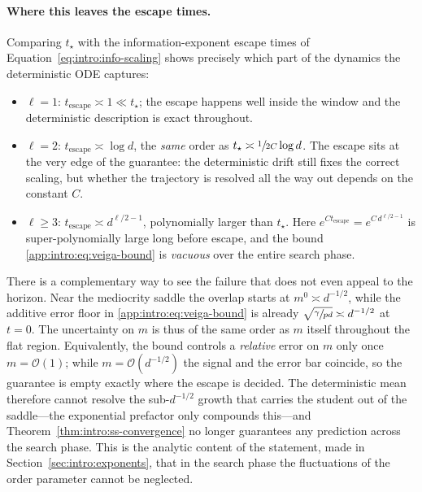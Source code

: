 \paragraph{Where this leaves the escape times.}
Comparing \(t_\star\) with the information-exponent escape times of
Equation~\eqref{eq:intro:info-scaling} shows precisely which part of the dynamics
the deterministic ODE captures:
\begin{itemize}
    \item \(\ell = 1\): \(t_\text{escape} \asymp 1 \ll t_\star\); the escape
    happens well inside the window and the deterministic description is exact
    throughout.
    \item \(\ell = 2\): \(t_\text{escape} \asymp \log d\), the \emph{same} order
    as \(t_\star \asymp \sfrac{1}{2C}\log d\). The escape sits at the very edge of
    the guarantee: the deterministic drift still fixes the correct scaling, but
    whether the trajectory is resolved all the way out depends on the constant
    \(C\).
    \item \(\ell \geq 3\): \(t_\text{escape} \asymp d^{\ell/2 - 1}\), polynomially
    larger than \(t_\star\). Here \(e^{C t_\text{escape}} = e^{C\,d^{\ell/2-1}}\)
    is super-polynomially large long before escape, and the bound
    \eqref{app:intro:eq:veiga-bound} is \emph{vacuous} over the entire search
    phase.
\end{itemize}
There is a complementary way to see the failure that does not even appeal to the
horizon. Near the mediocrity saddle the overlap starts at \(m^0 \asymp d^{-1/2}\),
while the additive error floor in \eqref{app:intro:eq:veiga-bound} is already
\(\sqrt{\sfrac{\gamma}{pd}} \asymp d^{-1/2}\) at \(t = 0\). The uncertainty on
\(m\) is thus of the same order as \(m\) itself throughout the flat region.
Equivalently, the bound controls a \emph{relative} error on \(m\) only once
\(m = \mathcal{O}(1)\); while \(m = \mathcal{O}(d^{-1/2})\) the signal and the
error bar coincide, so the guarantee is empty exactly where the escape is
decided. The deterministic mean therefore cannot resolve the sub-\(d^{-1/2}\)
growth that carries the student out of the saddle---the exponential prefactor
only compounds this---and Theorem~\ref{thm:intro:ss-convergence} no longer
guarantees any prediction across the search phase.
This is the analytic content of the statement, made in
Section~\ref{sec:intro:exponents}, that in the search phase the fluctuations of
the order parameter cannot be neglected.

